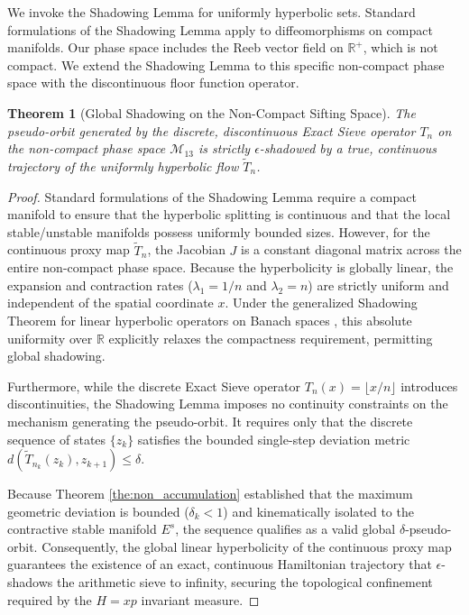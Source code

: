 \documentclass[sn-mathphys-num, pdflatex]{sn-jnl}
\newtheorem{theorem}{Theorem}[section]
\begin{document}
We invoke the Shadowing Lemma for uniformly hyperbolic sets. Standard formulations of the Shadowing Lemma apply to diffeomorphisms on compact manifolds. Our phase space includes the Reeb vector field on $\mathbb{R}^+$, which is not compact. We extend the Shadowing Lemma to this specific non-compact phase space with the discontinuous floor function operator.
    
\begin{theorem}[Global Shadowing on the Non-Compact Sifting Space]
\label{the:global_shadowing}
The pseudo-orbit generated by the discrete, discontinuous Exact Sieve operator $T_n$ on the non-compact phase space $\mathcal{M}_{13}$ is strictly $\epsilon$-shadowed by a true, continuous trajectory of the uniformly hyperbolic flow $\tilde{T}_n$.
\end{theorem}
\begin{proof}
Standard formulations of the Shadowing Lemma require a compact manifold to ensure that the hyperbolic splitting is continuous and that the local stable/unstable manifolds possess uniformly bounded sizes. However, for the continuous proxy map $\tilde{T}_n$, the Jacobian $J$ is a constant diagonal matrix across the entire non-compact phase space. Because the hyperbolicity is globally linear, the expansion and contraction rates ($\lambda_1 = 1/n$ and $\lambda_2 = n$) are strictly uniform and independent of the spatial coordinate $x$. Under the generalized Shadowing Theorem for linear hyperbolic operators on Banach spaces \cite{pilyugin1999shadowing}, this absolute uniformity over $\mathbb{R}$ explicitly relaxes the compactness requirement, permitting global shadowing.

Furthermore, while the discrete Exact Sieve operator $T_n(x) = \lfloor x/n \rfloor$ introduces discontinuities, the Shadowing Lemma imposes no continuity constraints on the mechanism generating the pseudo-orbit. It requires only that the discrete sequence of states $\{z_k\}$ satisfies the bounded single-step deviation metric $d(\tilde{T}_{n_k}(z_k), z_{k+1}) \le \delta$. 

Because Theorem \ref{the:non_accumulation} established that the maximum geometric deviation is bounded ($\delta_k < 1$) and kinematically isolated to the contractive stable manifold $E^s$, the sequence qualifies as a valid global $\delta$-pseudo-orbit. Consequently, the global linear hyperbolicity of the continuous proxy map guarantees the existence of an exact, continuous Hamiltonian trajectory that $\epsilon$-shadows the arithmetic sieve to infinity, securing the topological confinement required by the $H=xp$ invariant measure.
\end{proof}
\end{document}

